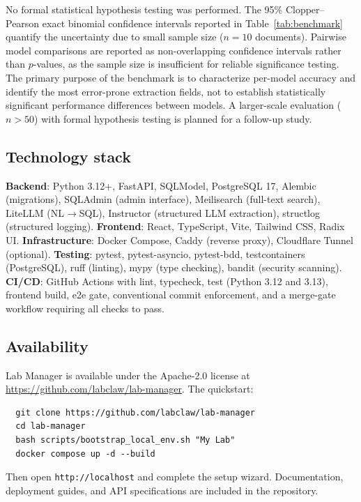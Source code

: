 \documentclass[11pt]{article}
\begin{document}
No formal statistical hypothesis testing was performed. The 95\%
Clopper--Pearson exact binomial confidence intervals reported in
Table~\ref{tab:benchmark} quantify the uncertainty due to small sample
size ($n = 10$ documents). Pairwise model comparisons are reported as
non-overlapping confidence intervals rather than $p$-values, as the
sample size is insufficient for reliable significance testing. The
primary purpose of the benchmark is to characterize per-model accuracy
and identify the most error-prone extraction fields, not to establish
statistically significant performance differences between models. A
larger-scale evaluation ($n > 50$) with formal hypothesis testing is
planned for a follow-up study.

\subsection{Technology stack}

\textbf{Backend}: Python 3.12+, FastAPI, SQLModel, PostgreSQL 17,
Alembic (migrations), SQLAdmin (admin interface), Meilisearch (full-text
search), LiteLLM (NL$\to$SQL), Instructor (structured LLM extraction),
structlog (structured logging).
\textbf{Frontend}: React, TypeScript, Vite, Tailwind CSS, Radix UI.
\textbf{Infrastructure}: Docker Compose, Caddy (reverse proxy),
Cloudflare Tunnel (optional).
\textbf{Testing}: pytest, pytest-asyncio, pytest-bdd, testcontainers
(PostgreSQL), ruff (linting), mypy (type checking), bandit (security
scanning).
\textbf{CI/CD}: GitHub Actions with lint, typecheck, test (Python 3.12
and 3.13), frontend build, e2e gate, conventional commit enforcement,
and a merge-gate workflow requiring all checks to pass.

\subsection{Availability}

Lab Manager is available under the Apache-2.0 license at
\url{https://github.com/labclaw/lab-manager}. The quickstart:
\begin{verbatim}
  git clone https://github.com/labclaw/lab-manager
  cd lab-manager
  bash scripts/bootstrap_local_env.sh "My Lab"
  docker compose up -d --build
\end{verbatim}
Then open \texttt{http://localhost} and complete the setup wizard.
Documentation, deployment guides, and API specifications are included
in the repository.

\end{document}
